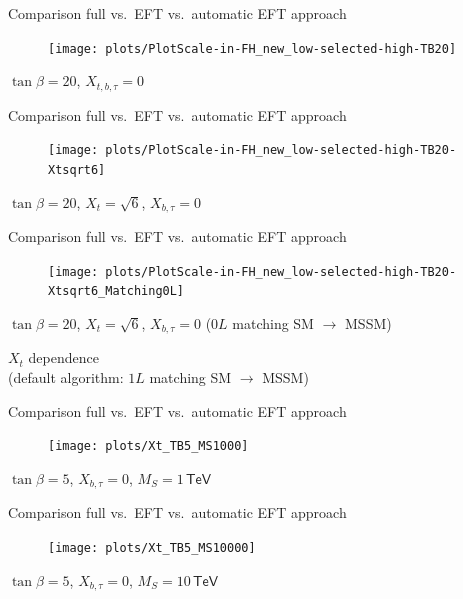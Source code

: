 \documentclass[hyperref={pdfpagelabels=false},ngerman]{beamer}
\newcommand{\eh}[1]{\,\mathsf{#1}}
\begin{document}
\begin{frame}[noframenumbering]{Comparison full vs.\ EFT vs.\ automatic EFT approach}
  \begin{figure}
    \centering
    \texttt{[image: plots/PlotScale-in-FH\_new\_low-selected-high-TB20]}
  \end{figure}
  $\tan\beta = 20$, $X_{t,b,\tau} = 0$
\end{frame}

\begin{frame}[noframenumbering]{Comparison full vs.\ EFT vs.\ automatic EFT approach}
  \begin{figure}
    \centering
    \texttt{[image: plots/PlotScale-in-FH\_new\_low-selected-high-TB20-Xtsqrt6]}
  \end{figure}
  $\tan\beta = 20$, $X_{t} = \sqrt{6}$, $X_{b,\tau} = 0$
\end{frame}

\begin{frame}[noframenumbering]{Comparison full vs.\ EFT vs.\ automatic EFT approach}
  \begin{figure}
    \centering
    \texttt{[image: plots/PlotScale-in-FH\_new\_low-selected-high-TB20-Xtsqrt6\_Matching0L]}
  \end{figure}
  $\tan\beta = 20$, $X_{t} = \sqrt{6}$, $X_{b,\tau} = 0$ ($0L$ matching SM $\rightarrow$ MSSM)
\end{frame}


\begin{frame}[noframenumbering]
  \begin{center}
    {\Large $X_t$ dependence}\\[1em]
    (default algorithm: $1L$ matching SM $\rightarrow$ MSSM)
  \end{center}
\end{frame}

\begin{frame}[noframenumbering]{Comparison full vs.\ EFT vs.\ automatic EFT approach}
  \begin{figure}
    \centering
    \texttt{[image: plots/Xt\_TB5\_MS1000]}
  \end{figure}
  $\tan\beta = 5$, $X_{b,\tau} = 0$, $M_S = 1\eh{TeV}$
\end{frame}

\begin{frame}[noframenumbering]{Comparison full vs.\ EFT vs.\ automatic EFT approach}
  \begin{figure}
    \centering
    \texttt{[image: plots/Xt\_TB5\_MS10000]}
  \end{figure}
  $\tan\beta = 5$, $X_{b,\tau} = 0$, $M_S = 10\eh{TeV}$
\end{frame}
\end{document}
